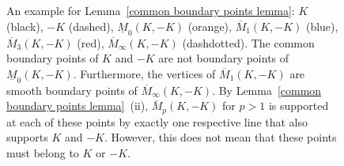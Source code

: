 \documentclass{article}
\begin{document}
\begin{figure}[h]
    \caption{An example for Lemma~\ref{common boundary points lemma}: $K$ (black), $-K$ (dashed), $\underline{M}_{0}(K,-K)$ (orange), $\overline{M}_{1}(K,-K)$ (blue), $\overline{M}_{3}(K,-K)$ (red), $\overline{M}_{\infty}(K,-K)$ (dashdotted). The common boundary points of $K$ and $-K$ are not boundary points of $\underline{M}_{0}(K,-K)$. Furthermore, the vertices of $\overline{M}_{1}(K,-K)$ are smooth boundary points of $\overline{M}_{\infty}(K,-K)$. By Lemma~\ref{common boundary points lemma}~(ii), $\overline{M}_{p}(K,-K)$ for $p > 1$ is supported at each of these points by exactly one respective line that also supports $K$ and $-K$. However, this does not mean that these points must belong to $K$ or $-K$.}
    \label{fig:common_boundary_points_lemma}
\end{figure}
\end{document}
